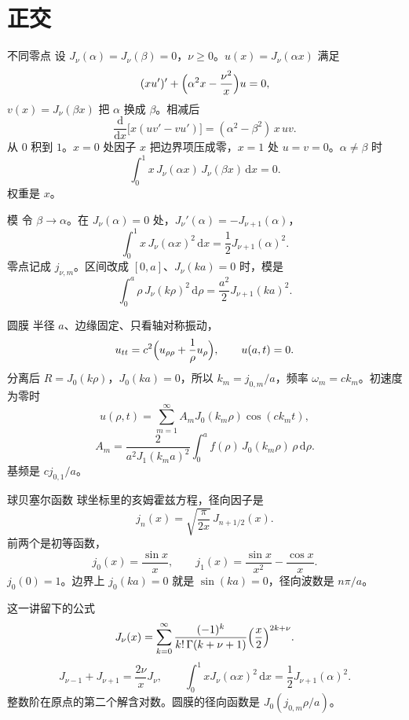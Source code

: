 \documentclass[fontset=windows, chinese, 10pt, xcolor=dvipsnames]{beamer}
\begin{document}
\section{正交}

\begin{frame}{不同零点}
  设 $J_{\nu}(\alpha)=J_{\nu}(\beta)=0$，$\nu\geq 0$。$u(x)=J_{\nu}(\alpha x)$ 满足
  \[
    (xu')'+\Bigl(\alpha^2 x-\frac{\nu^2}{x}\Bigr)u=0,
  \]
  $v(x)=J_{\nu}(\beta x)$ 把 $\alpha$ 换成 $\beta$。相减后
  \[
    \frac{\mathrm{d}}{\mathrm{d}x}\bigl[x(uv'-vu')\bigr]
    =(\alpha^2-\beta^2)\,x\,uv.
  \]
  从 $0$ 积到 $1$。$x=0$ 处因子 $x$ 把边界项压成零，$x=1$ 处 $u=v=0$。$\alpha\neq\beta$ 时
  \[
    \int_0^{1} x\,J_{\nu}(\alpha x)\,J_{\nu}(\beta x)\,\mathrm{d}x=0.
  \]
  权重是 $x$。
\end{frame}

\begin{frame}{模}
  令 $\beta\to\alpha$。在 $J_{\nu}(\alpha)=0$ 处，$J_{\nu}'(\alpha)=-J_{\nu+1}(\alpha)$，
  \begin{equation*}
    \boxed{\displaystyle
      \int_0^{1} x\,J_{\nu}(\alpha x)^2\,\mathrm{d}x
      =\frac12 J_{\nu+1}(\alpha)^2.}
  \end{equation*}
  零点记成 $j_{\nu,m}$。区间改成 $[0,a]$、$J_{\nu}(ka)=0$ 时，模是
  \[
    \int_0^{a}\rho\,J_{\nu}(k\rho)^2\,\mathrm{d}\rho
    =\frac{a^2}{2}J_{\nu+1}(ka)^2.
  \]
\end{frame}

\begin{frame}{圆膜}
  半径 $a$、边缘固定、只看轴对称振动，
  \[
    u_{tt}
    =c^2\Bigl(u_{\rho\rho}+\frac{1}{\rho}u_{\rho}\Bigr),
    \qquad u(a,t)=0.
  \]
  分离后 $R=J_0(k\rho)$，$J_0(ka)=0$，所以 $k_m=j_{0,m}/a$，频率 $\omega_m=c k_m$。初速度为零时
  \[
    u(\rho,t)
    =\sum_{m=1}^{\infty} A_m J_0(k_m\rho)\cos(c k_m t),
  \]
  \[
    A_m
    =\frac{2}{a^2 J_1(k_m a)^2}
      \int_0^{a} f(\rho)\,J_0(k_m\rho)\,\rho\,\mathrm{d}\rho.
  \]
  基频是 $c j_{0,1}/a$。
\end{frame}

\begin{frame}{球贝塞尔函数}
  球坐标里的亥姆霍兹方程，径向因子是
  \[
    j_n(x)=\sqrt{\frac{\pi}{2x}}\,J_{n+1/2}(x).
  \]
  前两个是初等函数，
  \[
    j_0(x)=\frac{\sin x}{x},
    \qquad
    j_1(x)=\frac{\sin x}{x^2}-\frac{\cos x}{x}.
  \]
  $j_0(0)=1$。边界上 $j_0(ka)=0$ 就是 $\sin(ka)=0$，径向波数是 $n\pi/a$。
\end{frame}

\begin{frame}{这一讲留下的公式}
  \[
    J_{\nu}(x)
    =\sum_{k=0}^{\infty}
      \frac{(-1)^k}{k!\,\Gamma(k+\nu+1)}
      \Bigl(\frac{x}{2}\Bigr)^{2k+\nu}.
  \]
  \[
    J_{\nu-1}+J_{\nu+1}=\frac{2\nu}{x}J_{\nu},
    \qquad
    \int_0^{1} x J_{\nu}(\alpha x)^2\,\mathrm{d}x
    =\frac12 J_{\nu+1}(\alpha)^2.
  \]
  整数阶在原点的第二个解含对数。圆膜的径向函数是 $J_0(j_{0,m}\rho/a)$。
\end{frame}
\end{document}
